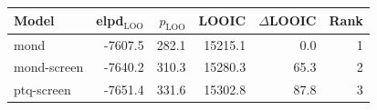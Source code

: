 \begin{tabular}{lrrrrr}
\toprule
Model & elpd$_{\mathrm{LOO}}$ & $p_{\mathrm{LOO}}$ & LOOIC & $\Delta$LOOIC & Rank \\
\midrule
mond & -7607.5 & 282.1 & 15215.1 & 0.0 & 1 \\
mond-screen & -7640.2 & 310.3 & 15280.3 & 65.3 & 2 \\
ptq-screen & -7651.4 & 331.6 & 15302.8 & 87.8 & 3 \\
\bottomrule
\end{tabular}